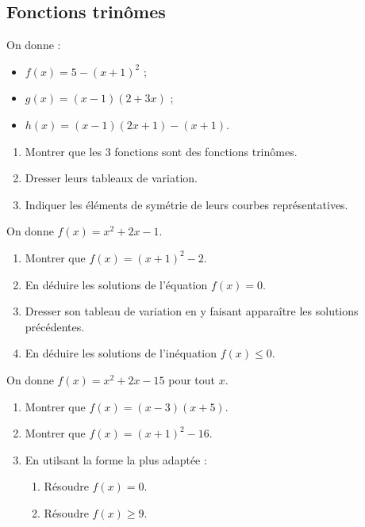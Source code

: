 \sautpage

\subsection{Fonctions trin\^omes}

\begin{multicols}{2}
\begin{exo}
On donne :
\begin{itemize}
 \item $f(x)=5-(x+1)^2$ ;
  \item $g(x)=(x-1)(2+3x)$ ;
 \item $h(x)=(x-1)(2x+1)-(x+1)$.
\end{itemize}%
\begin{enumerate}
 \item Montrer que les 3 fonctions sont des fonctions trin\^omes.
 \item Dresser leurs tableaux de variation.
 \item Indiquer les \'el\'ements de sym\'etrie de leurs courbes repr\'esentatives.
\end{enumerate}
\end{exo}

\begin{exo}
 On donne $f(x)=x^2+2x-1$.
 \begin{enumerate}
  \item Montrer que $f(x)=(x+1)^2-2$.
  \item En d\'eduire les solutions de l'\'equation $f(x)=0$.
  \item Dresser son tableau de variation en y faisant appara\^itre les solutions pr\'ec\'edentes.
  \item En d\'eduire les solutions de l'in\'equation $f(x)\leqslant 0$.
 \end{enumerate}

\end{exo}


\begin{exo}
 On donne $f(x)=x^2+2x-15$ pour tout $x$.
 \begin{enumerate}
  \item Montrer que $f(x)=(x-3)(x+5)$.
  \item Montrer que $f(x)=(x+1)^2-16$.
  \item En utilsant la forme la plus adapt\'ee :
	\begin{enumerate}
	 \item R\'esoudre $f(x)=0$.
	 \item R\'esoudre $f(x)\geqslant 9$.
	\end{enumerate}
 \end{enumerate}
\end{exo}


\end{multicols}
